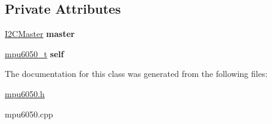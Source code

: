 \subsection*{Private Attributes}
\begin{DoxyCompactItemize}
\item 
\mbox{\label{classMpu6050_a268012468e495b0888a659dc0458a72c}} 
\hyperlink{classI2CMaster}{I2\+C\+Master} {\bfseries master}
\item 
\mbox{\label{classMpu6050_a53fb7f46e549c2fc2a40a3fcca31825f}} 
\hyperlink{structmpu6050__t}{mpu6050\+\_\+t} {\bfseries self}
\end{DoxyCompactItemize}


The documentation for this class was generated from the following files\+:\begin{DoxyCompactItemize}
\item 
\hyperlink{mpu6050_8h}{mpu6050.\+h}\item 
mpu6050.\+cpp\end{DoxyCompactItemize}
